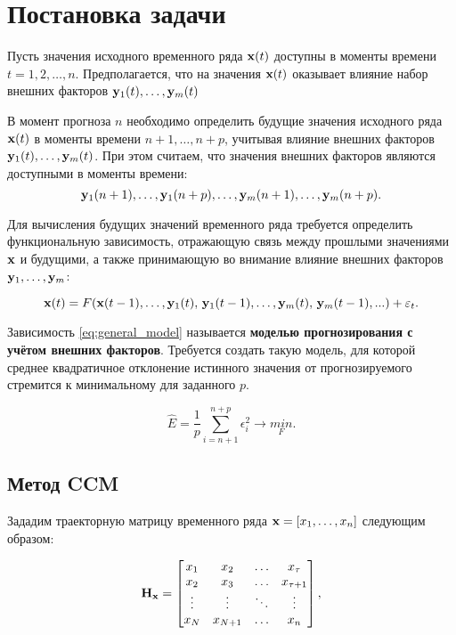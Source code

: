 \documentclass[a4paper, 12pt]{article}
\begin{document}
\section{Постановка задачи}
Пусть значения исходного временного ряда $\mathbf{x}(t)$ доступны в  моменты времени $t = 1, 2, \ldots, n$. Предполагается, что на значения $\mathbf{x}(t)$ оказывает влияние набор внешних факторов $\mathbf{y}_1(t), \ldots, \mathbf{y}_m(t)$

В момент прогноза $n$ необходимо определить будущие значения исходного ряда $\mathbf{x}(t)$ в моменты времени $n+1, \ldots, n+p$, учитывая влияние внешних факторов $\mathbf{y}_1(t), \ldots, \mathbf{y}_m(t)$. При этом считаем, что значения внешних факторов являются доступными в моменты времени: \[\mathbf{y}_1(n+1), \ldots, \mathbf{y}_1(n+p), \ldots, \mathbf{y}_m(n+1), \ldots, \mathbf{y}_m(n+p).\]

Для вычисления будущих значений временного ряда требуется определить функциональную зависимость, отражающую связь между прошлыми значениями $\mathbf{x}$ и будущими, а также принимающую во внимание влияние внешних факторов $\mathbf{y}_1, \ldots, \mathbf{y}_m$:

\begin{equation} \label{eq:general_model}
	\mathbf{x}(t) = F(\mathbf{x}(t-1), \ldots, \mathbf{y}_1(t), \, \mathbf{y}_1(t-1), \ldots, \mathbf{y}_m(t), \, \mathbf{y}_m(t-1), ...) + \varepsilon_t.
\end{equation}

Зависимость \eqref{eq:general_model} называется \textbf{моделью прогнозирования с учётом внешних факторов}.
Требуется создать такую модель, для которой среднее квадратичное отклонение истинного значения от прогнозируемого стремится к минимальному для заданного $p$. 

\begin{equation} \label{eq:model_error}
	\hat{E} = \dfrac{1}{p} \sum\limits_{i=n+1}^{n+p} \epsilon_i^2 \rightarrow \underset{F}{min}.
\end{equation}

\subsection{Метод CCM}
Зададим траекторную матрицу временного ряда $\mathbf{x} = [x_1, \ldots, x_n]$ следующим образом: 

\begin{equation*} \label{eq:traj_mat}
	\mathbf{H}_{\mathbf{x}} = \begin{bmatrix}
		x_1 & x_2 & \ldots & x_{\tau} \\
		x_2 & x_3 & \ldots & x_{\tau+1} \\
		\vdots & \vdots & \ddots & \vdots \\
		x_{N} & x_{N+1} & \ldots & x_n
	\end{bmatrix}, 
\end{equation*} 
\end{document}
